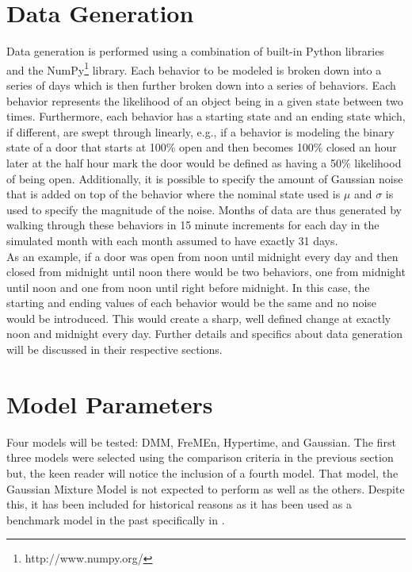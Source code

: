   \section{ Data Generation }

  Data generation is performed using a combination of built-in Python libraries and
  the NumPy\footnote[1]{http://www.numpy.org/} library. Each behavior to be modeled is broken down into a series of days which is
  then further broken down into a series of behaviors. Each behavior
  represents the likelihood of an object being in a given state between two
  times. Furthermore, each behavior has a starting state and an ending state
  which, if different, are swept through linearly, e.g., if a behavior is
  modeling the binary state of a door that starts at 100\% open and then becomes
  100\% closed an hour later at the half hour mark the door would be defined as having
  a 50\% likelihood of being open. Additionally, it is possible
  to specify the amount of Gaussian noise that is added on top of the
  behavior where the nominal state used is $\mu$ and $\sigma$ is used to
  specify the magnitude of the noise. Months of data are thus generated by
  walking through these behaviors in 15 minute increments for each day in the
  simulated month with each month assumed to have exactly 31 days. \\

  As an example, if a door was open from noon until midnight every day and then closed from
  midnight until noon there would be two behaviors, one from midnight until
  noon and one from noon until right before midnight. In this case, the
  starting and ending values of each behavior would be the same and no noise
  would be introduced. This would create a sharp, well defined change at
  exactly noon and midnight every day. Further details and specifics about data
  generation will be discussed in their respective sections. \\

  \section{ Model Parameters }

  Four models will be tested: DMM, FreMEn, Hypertime, and Gaussian. The first
  three models were selected using the comparison criteria in the previous
  section but, the keen reader will notice the inclusion of a fourth model.
  That model, the Gaussian Mixture Model is not
  expected to perform as well as the others. Despite this, it has been included
  for historical reasons as it has been used as a benchmark model
  in the past specifically in \cite{Coppola2016}. \\

